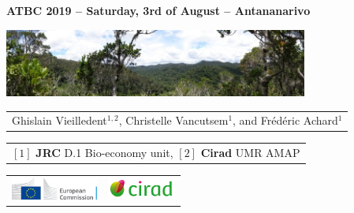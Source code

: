 {

  \begin{frame}
    \begin{center}
        \small{\textbf{ATBC 2019 -- Saturday, 3rd of August -- Antananarivo}}
    \end{center}
    \vspace{-0.5cm}
    \titlepage %
    \vspace{-2.5cm}
    \begin{center}
      \includegraphics[width=10cm]{figs/Banniere.png}
    \end{center}
    \begin{center}

        \begin{tabular}{c}
          Ghislain Vieilledent$^{1,2}$, Christelle Vancutsem$^{1}$, and Frédéric Achard$^{1}$
        \end{tabular}

      \vspace{0.25cm}

      {\small
        \begin{tabular}{c}
          $[1]$ \textbf{JRC} D.1 Bio-economy unit,
          $[2]$ \textbf{Cirad} UMR AMAP
        \end{tabular}
      }

      \vspace{0.25cm}

      \begin{tabular}{C{3cm}C{3cm}}
        \includegraphics[height=0.75cm]{figs/Logo-JRC.jpg} &
        \includegraphics[height=0.75cm]{figs/Logo-Cirad.png}\\
      \end{tabular}

    \end{center}
    
  \end{frame}
}
\setcounter{framenumber}{0}


